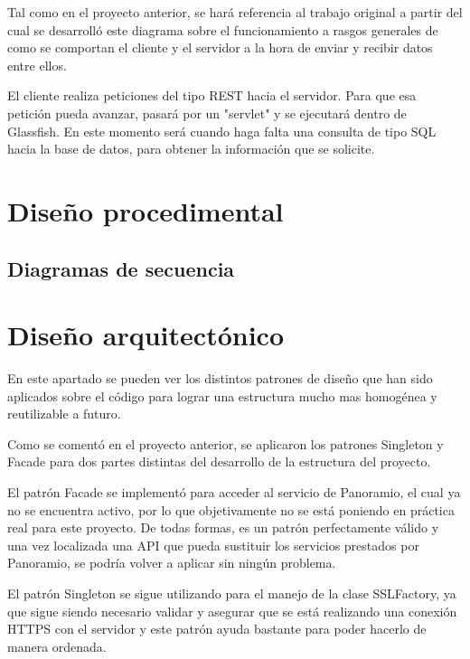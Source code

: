 Tal como en el proyecto anterior, se hará referencia al trabajo original \cite{tfg1} a partir del cual se desarrolló este diagrama sobre el funcionamiento a rasgos generales de como se comportan el cliente y el servidor a la hora de enviar y recibir datos entre ellos.

El cliente realiza peticiones del tipo REST hacia el servidor. Para que esa petición pueda avanzar, pasará por un "servlet" y se ejecutará dentro de Glassfish. En este momento será cuando haga falta una consulta de tipo SQL hacia la base de datos, para obtener la información que se solicite.


\section{Diseño procedimental}

\subsection{Diagramas de secuencia}

\section{Diseño arquitectónico}

En este apartado se pueden ver los distintos patrones de diseño que han sido aplicados sobre el código para lograr una estructura mucho mas homogénea y reutilizable a futuro.

Como se comentó en el proyecto anterior, se aplicaron los patrones Singleton y Facade para dos partes distintas del desarrollo de la estructura del proyecto.

El patrón Facade se implementó para acceder al servicio de Panoramio, el cual ya no se encuentra activo, por lo que objetivamente no se está poniendo en práctica real para este proyecto. De todas formas, es un patrón perfectamente válido y una vez localizada una API que pueda sustituir los servicios prestados por Panoramio, se podría volver a aplicar sin ningún problema.

El patrón Singleton se sigue utilizando para el manejo de la clase SSLFactory, ya que sigue siendo necesario validar y asegurar que se está realizando una conexión HTTPS con el servidor y este patrón ayuda bastante para poder hacerlo de manera ordenada.